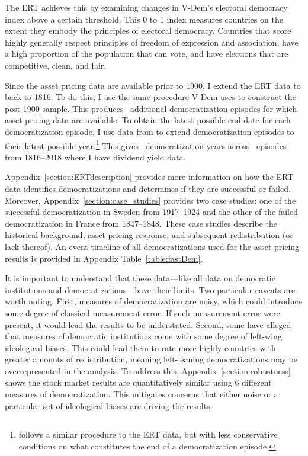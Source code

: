 \documentclass[12pt]{article}
\numberwithin{equation}{section}
\begin{document}
The ERT achieves this by examining changes in V-Dem's electoral democracy index above a certain threshold. This 0 to 1 index measures countries on the extent they embody the principles of electoral democracy. Countries that score highly generally respect principles of freedom of expression and association, have a high proportion of the population that can vote, and have elections that are competitive, clean, and fair. 

Since the asset pricing data are available prior to 1900, I extend the ERT data to back to 1816. To do this, I use the same procedure V-Dem uses to construct the post-1900 sample. This produces \demEpisodesPre\ additional democratization episodes for which asset pricing data are available. To obtain the latest possible end date for each democratization episode, I use data from \cite{Lindberg2018} to extend democratization episodes to their latest possible year.\footnote{\cite{Lindberg2018} follows a similar procedure to the ERT data, but with less conservative conditions on what constitutes the end of a democratization episode.} This gives \demYears\ democratization years across \demEpisodes\ episodes from 1816--2018 where I have dividend yield data.

Appendix~\ref{section:ERTdescription} provides more information on how the ERT data identifies democratizations and determines if they are successful or failed. Moreover, Appendix~\ref{section:case_studies} provides two case studies: one of the successful democratization in Sweden from 1917--1924 and the other of the failed democratization in France from 1847--1848. These case studies describe the historical background, asset pricing response, and subsequent redistribution (or lack thereof). An event timeline of all democratizations used for the asset pricing results is provided in Appendix Table~\ref{table:fastDem}.

\label{par:democratization_limit}
It is important to understand that these data---like all data on democratic institutions and democratizations---have their limits. Two particular caveats are worth noting. First, measures of democratization are noisy, which could introduce some degree of classical measurement error. If such measurement error were present, it would lead the results to be understated. Second, some have alleged that measures of democratic institutions come with some degree of left-wing ideological biases. This could lead them to rate more highly countries with greater amounts of redistribution, meaning left-leaning democratizations may be overrepresented in the analysis.  To address this, Appendix~\ref{section:robustness} shows the stock market results are quantitatively similar using 6 different measures of democratization.  This mitigates concerns that either noise or a particular set of ideological biases are driving the results.
\end{document}
